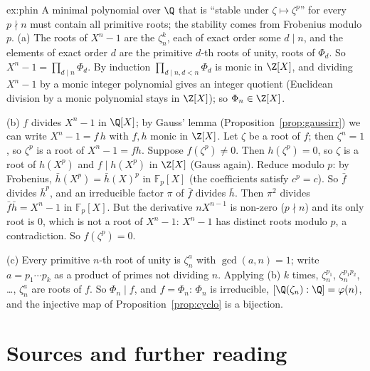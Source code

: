 \begin{solution}{ex:phin}
\idea A minimal polynomial over $\Q$ that is ``stable under $\zeta\mapsto\zeta^p$'' for every $p\nmid n$ must contain all primitive roots; the stability comes from Frobenius modulo $p$.
\writeup (a) The roots of $X^n-1$ are the $\zeta_n^k$, each of exact order some $d\mid n$, and the elements of exact order $d$ are the primitive $d$-th roots of unity, roots of $\Phi_d$. So $X^n-1=\prod_{d\mid n}\Phi_d$. By induction $\prod_{d\mid n,d<n}\Phi_d$ is monic in $\Z[X]$, and dividing $X^n-1$ by a monic integer polynomial gives an integer quotient (Euclidean division by a monic polynomial stays in $\Z[X]$); so $\Phi_n\in\Z[X]$.

(b) $f$ divides $X^n-1$ in $\Q[X]$; by Gauss' lemma (Proposition~\ref{prop:gaussirr}) we can write $X^n-1=f\,h$ with $f,h$ monic in $\Z[X]$. Let $\zeta$ be a root of $f$; then $\zeta^n=1$, so $\zeta^p$ is a root of $X^n-1=fh$. Suppose $f(\zeta^p)\ne0$. Then $h(\zeta^p)=0$, so $\zeta$ is a root of $h(X^p)$ and $f\mid h(X^p)$ in $\Z[X]$ (Gauss again). Reduce modulo $p$: by Frobenius, $\bar h(X^p)=\bar h(X)^p$ in $\mathbb F_p[X]$ (the coefficients satisfy $c^p=c$). So $\bar f$ divides $\bar h^p$, and an irreducible factor $\pi$ of $\bar f$ divides $\bar h$. Then $\pi^2$ divides $\bar f\bar h=X^n-1$ in $\mathbb F_p[X]$. But the derivative $nX^{n-1}$ is non-zero ($p\nmid n$) and its only root is $0$, which is not a root of $X^n-1$: $X^n-1$ has distinct roots modulo $p$, a contradiction. So $f(\zeta^p)=0$.

(c) Every primitive $n$-th root of unity is $\zeta_n^a$ with $\gcd(a,n)=1$; write $a=p_1\cdots p_k$ as a product of primes not dividing $n$. Applying (b) $k$ times, $\zeta_n^{p_1}$, $\zeta_n^{p_1p_2}$, \dots, $\zeta_n^a$ are roots of $f$. So $\Phi_n\mid f$, and $f=\Phi_n$: $\Phi_n$ is irreducible, $[\Q(\zeta_n):\Q]=\varphi(n)$, and the injective map of Proposition~\ref{prop:cyclo} is a bijection.
\end{solution}

\section*{Sources and further reading}

